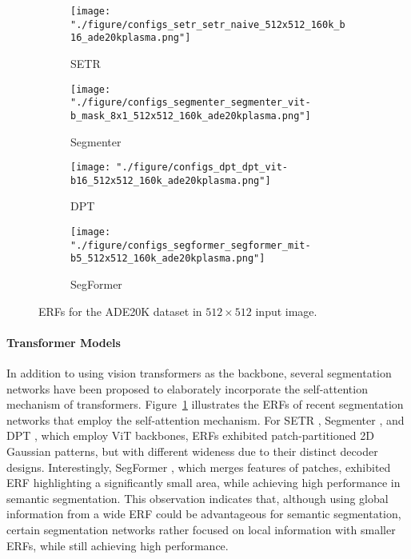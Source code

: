 \documentclass{article}
\def\figref#1{Figure~\ref{#1}}
\begin{document}
\begin{figure}[t!]
	\centering
	\begin{subfigure}[b]{0.241\linewidth}
		\centering
		\texttt{[image: "./figure/configs\_setr\_setr\_naive\_512x512\_160k\_b16\_ade20kplasma.png"]}
		\caption{SETR}
	\end{subfigure}
	\hfill
	\begin{subfigure}[b]{0.241\linewidth}
		\centering
		\texttt{[image: "./figure/configs\_segmenter\_segmenter\_vit-b\_mask\_8x1\_512x512\_160k\_ade20kplasma.png"]}
		\caption{Segmenter}
	\end{subfigure}
	\hfill
	\begin{subfigure}[b]{0.241\linewidth}
		\centering
		\texttt{[image: "./figure/configs\_dpt\_dpt\_vit-b16\_512x512\_160k\_ade20kplasma.png"]}
		\caption{DPT}
	\end{subfigure}
	\hfill
	\begin{subfigure}[b]{0.241\linewidth}
		\centering
		\texttt{[image: "./figure/configs\_segformer\_segformer\_mit-b5\_512x512\_160k\_ade20kplasma.png"]}
		\caption{SegFormer}
	\end{subfigure}
	\caption{ERFs for the ADE20K dataset in $512 \times 512$ input image.}
	\label{fig:trss}
\end{figure}

\paragraph{Transformer Models} In addition to using vision transformers as the backbone, several segmentation networks have been proposed to elaborately incorporate the self-attention mechanism of transformers. \figref{fig:trss} illustrates the ERFs of recent segmentation networks that employ the self-attention mechanism. For SETR \citep{DBLP:conf/cvpr/ZhengLZZLWFFXT021}, Segmenter \citep{DBLP:conf/iccv/StrudelPLS21}, and DPT \citep{DBLP:conf/iccv/RanftlBK21}, which employ ViT backbones, ERFs exhibited patch-partitioned 2D Gaussian patterns, but with different wideness due to their distinct decoder designs. Interestingly, SegFormer \citep{DBLP:conf/nips/XieWYAAL21}, which merges features of patches, exhibited ERF highlighting a significantly small area, while achieving high performance in semantic segmentation. This observation indicates that, although using global information from a wide ERF could be advantageous for semantic segmentation, certain segmentation networks rather focused on local information with smaller ERFs, while still achieving high performance.
\end{document}
